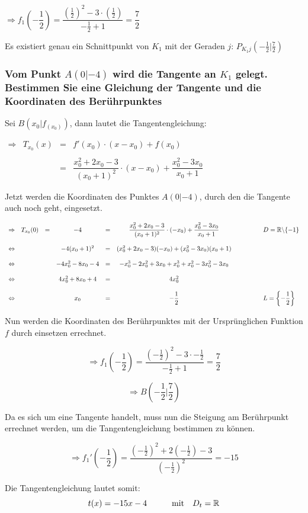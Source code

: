 \documentclass[main.tex]{subfiles}
\begin{document}
$\Rightarrow f_{1}(-\dfrac{1}{2}) = \dfrac{(\frac{1}{2})^2 -3\cdot (\frac{1}{2})}{-\frac{1}{2}+1} = \dfrac{7}{2}$

Es existiert genau ein Schnittpunkt von $K_{1}$ mit der Geraden $j$: $P_{K_{1}j}(-\frac{1}{2}|\frac{7}{2})$

\subsubsection{ Vom Punkt $A(0|-4)$ wird die Tangente an $K_{1}$ gelegt. Bestimmen Sie eine Gleichung der Tangente und die Koordinaten des Berührpunktes }

Sei $B(x_{0}|f_(x_{0}))$, dann lautet die Tangentengleichung:

$\begin{array}{rccl}
	\Rightarrow & T_{x_{0}}(x) &=& f'(x_{0}) \cdot (x-x_{0}) +f(x_{0}) \\ \\
	&&=& \dfrac{x_{0}^2 +2x_{0}-3}{(x_{0}+1)^2} \cdot (x-x_{0}) + \dfrac{x_{0}^2 -3x_{0}}{x_{0}+1}
\end{array}$

Jetzt werden die Koordinaten des Punktes $A(0|-4)$, durch den die Tangente auch noch geht, eingesetzt.

$\begin{array}{rcccccl}
	\Rightarrow & T_{x_{0}}(0) &=& -4 & = & \dfrac{x_{0}^2 +2x_{0}-3}{(x_{0}+1)^2} \cdot (-x_{0}) + \dfrac{x_{0}^2 -3x_{0}}{x_{0}+1} &\qquad \qquad D=\mathbb{R} \backslash \{ -1\}\\\\
	\Leftrightarrow &&& -4 (x_{0}+1)^2 &=& (x_{0}^2+2x_{0}-3)(-x_{0})+(x_{0}^2-3x_{0})(x_{0}+1) & \\\\
	\Leftrightarrow &&& -4x_{0}^2-8x_{0}-4 &=& -x_{0}^3-2x_{0}^2+3x_{0}+x_{0}^3+x_{0}^2-3x_{0}^2-3x_{0}& \\\\
	\Leftrightarrow &&& 4x_{0}^2+8x_{0}+4 &=& 4x_{0}^2&\\\\
	\Leftrightarrow &&& x_{0} &=& -\dfrac{1}{2}&\qquad \qquad L= \left \{ -\dfrac{1}{2} \right \}
\end{array}$

Nun werden die Koordinaten des Berührpunktes mit der Ursprünglichen Funktion $f$ durch einsetzen errechnet.

$$\Rightarrow f_{1} \left (-\dfrac{1}{2}\right ) =  \dfrac{\left (-\frac{1}{2}\right ) ^2-3\cdot - \frac{1}{2}}{-\frac{1}{2}+1} = \dfrac{7}{2} $$

$$\Rightarrow B \left (-\dfrac{1}{2}| \dfrac{7}{2} \right )$$

Da es sich um eine Tangente handelt, muss nun die Steigung am Berührpunkt errechnet werden, um die Tangentengleichung bestimmen zu können.

$$\Rightarrow f_{1}' \left (-\dfrac{1}{2} \right ) = \dfrac{\left (-\frac{1}{2} \right )^2 +2\left (-\frac{1}{2} \right ) -3 }{\left (-\frac{1}{2} \right )^2}  = -15$$

Die Tangentengleichung lautet somit:
$$t(x) = -15x-4\qquad \quad \text{mit} \quad D_{t}=\mathbb{R}$$
\end{document}
